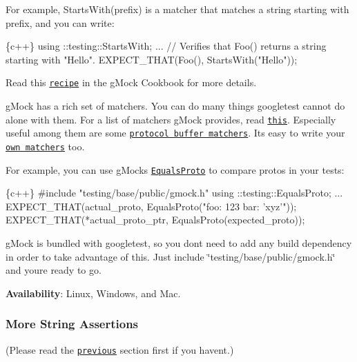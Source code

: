 For example, {\ttfamily Starts\+With(prefix)} is a matcher that matches a string starting with {\ttfamily prefix}, and you can write\+:


\begin{DoxyCode}
\{c++\}
using ::testing::StartsWith;
...
    // Verifies that Foo() returns a string starting with "Hello".
    EXPECT\_THAT(Foo(), StartsWith("Hello"));
\end{DoxyCode}


Read this \href{../../googlemock/docs/CookBook.md#using-matchers-in-google-test-assertions}{\tt recipe} in the g\+Mock Cookbook for more details.

g\+Mock has a rich set of matchers. You can do many things googletest cannot do alone with them. For a list of matchers g\+Mock provides, read \href{../../googlemock/docs/CookBook.md#using-matchers}{\tt this}. Especially useful among them are some \href{https://github.com/google/nucleus/blob/master/nucleus/testing/protocol-buffer-matchers.h}{\tt protocol buffer matchers}. It\textquotesingle{}s easy to write your \href{../../googlemock/docs/CookBook.md#writing-new-matchers-quickly}{\tt own matchers} too.

For example, you can use g\+Mock\textquotesingle{}s \href{https://github.com/google/nucleus/blob/master/nucleus/testing/protocol-buffer-matchers.h}{\tt Equals\+Proto} to compare protos in your tests\+:


\begin{DoxyCode}
\{c++\}
#include "testing/base/public/gmock.h"
using ::testing::EqualsProto;
...
    EXPECT\_THAT(actual\_proto, EqualsProto("foo: 123 bar: 'xyz'"));
    EXPECT\_THAT(*actual\_proto\_ptr, EqualsProto(expected\_proto));
\end{DoxyCode}


g\+Mock is bundled with googletest, so you don\textquotesingle{}t need to add any build dependency in order to take advantage of this. Just include {\ttfamily \char`\"{}testing/base/public/gmock.\+h\char`\"{}} and you\textquotesingle{}re ready to go.

{\bfseries Availability}\+: Linux, Windows, and Mac.

\subsubsection*{More String Assertions}

(Please read the \href{#asserting-using-gmock-matchers}{\tt previous} section first if you haven\textquotesingle{}t.)

